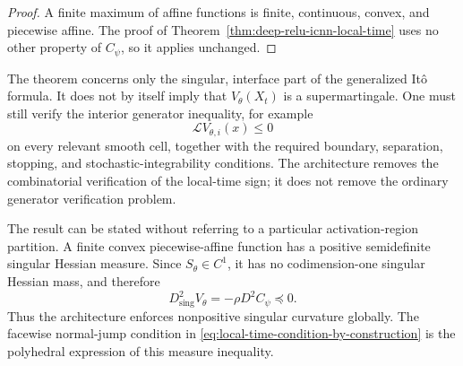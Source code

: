 \begin{proof}
A finite maximum of affine functions is finite, continuous, convex, and
piecewise affine.  The proof of
Theorem~\ref{thm:deep-relu-icnn-local-time} uses no other property of
\(C_\psi\), so it applies unchanged.
\end{proof}

\begin{remark}
The theorem concerns only the singular, interface part of the generalized
It\^o formula.  It does not by itself imply that \(V_\theta(X_t)\) is a
supermartingale.  One must still verify the interior generator inequality,
for example
\[
    \mathcal LV_{\theta,i}(x)\leq 0
\]
on every relevant smooth cell, together with the required boundary,
separation, stopping, and stochastic-integrability conditions.  The
architecture removes the combinatorial verification of the local-time sign;
it does not remove the ordinary generator verification problem.
\end{remark}

\begin{remark}
The result can be stated without referring to a particular activation-region
partition.  A finite convex piecewise-affine function has a positive
semidefinite singular Hessian measure.  Since \(S_\theta\in C^1\), it has no
codimension-one singular Hessian mass, and therefore
\[
    D^2_{\mathrm{sing}}V_\theta
    =
    -\rho D^2C_\psi
    \preceq 0.
\]
Thus the architecture enforces nonpositive singular curvature globally.  The
facewise normal-jump condition in
\eqref{eq:local-time-condition-by-construction} is the polyhedral expression
of this measure inequality.
\end{remark}
